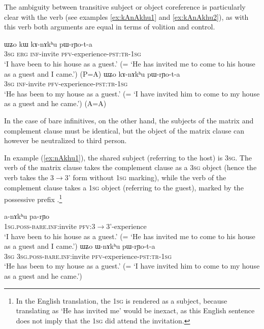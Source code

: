 The ambiguity between transitive subject or object coreference is particularly clear with the verb  (see examples \ref{ex:kAnAkhu1} and \ref{ex:kAnAkhu2}), as with this verb both arguments are equal in terms of volition and control.

\begin{exe}
\ex  \label{ex:kAnAkhu1}
\gll ɯʑo kɯ kɤ-nɤkʰu pɯ-rɲo-t-a  \\
\textsc{3sg} \textsc{erg} \textsc{inf}-invite \textsc{pfv}-experience-\textsc{pst:tr-1sg} \\
\glt `I have been to his house as a guest.'  (= `He has invited me to come to his house as a guest and I came.') (P=A)
\ex  \label{ex:kAnAkhu2}
\gll ɯʑo kɤ-nɤkʰu pɯ-rɲo-t-a  \\
\textsc{3sg}  \textsc{inf}-invite \textsc{pfv}-experience-\textsc{pst:tr-1sg} \\
\glt `He has been to my house as a guest.' (= `I have invited him to come to my house as a guest and he came.') (A=A)
\end{exe}

In the case of bare infinitives, on the other hand, the subjects of the matrix and complement clause must be identical, but the object of the matrix clause can however be neutralized to third person.

In example (\ref{ex:nAkhu1}), the shared subject (referring to the host) is \textsc{3sg}. The verb of the matrix clause takes the complement clause as a \textsc{3sg} object (hence the verb takes the 3$\rightarrow$3' form without \textsc{1sg} marking), while the verb of the complement clause takes a \textsc{1sg} object (referring to the guest), marked by the possessive prefix .\footnote{In the English translation, the \textsc{1sg} is rendered as a subject, because translating   as `He has invited me' would be inexact, as this English sentence does not imply that the \textsc{1sg} did attend the invitation. }

\begin{exe}
\ex  \label{ex:nAkhu1}
\gll a-nɤkʰu pa-rɲo \\
\textsc{1sg.poss-bare.inf:}invite \textsc{pfv:3$\rightarrow$3'}-experience \\
\glt `I have been to his house as a guest.' (= `He has invited me to come to his house as a guest and I came.')
\ex  \label{ex:nAkhu2}
\gll ɯʑo ɯ-nɤkʰu pɯ-rɲo-t-a  \\
\textsc{3sg}  \textsc{3sg.poss-bare.inf:}invite \textsc{pfv}-experience-\textsc{pst:tr-1sg} \\
\glt `He has been to my house as a guest.' (= `I have invited him to come to my house as a guest and he came.')
\end{exe}


